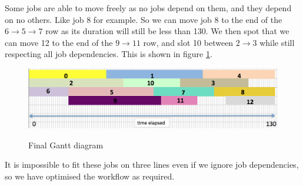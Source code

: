 \documentclass[paper=a4, fontsize=12pt]{scrartcl} %
\numberwithin{equation}{section}       %
\numberwithin{figure}{section}         %
\numberwithin{table}{section}          %
\begin{document}
Some jobs are able to move freely as no jobs depend on them, and they depend on no others. Like job 8 for example. So we can move job 8 to the end of the $6 \to 5 \to 7$ row as its duration will still be less than 130. We then spot that we can move 12 to the end of the $9 \to 11$ row, and slot 10 between $2 \to 3$ while still respecting all job dependencies. This is shown in figure \ref{fourth}.

\begin{figure}[h]
\caption{Final Gantt diagram}
\centering
\includegraphics[scale=0.6]{final}\label{fourth}
\end{figure}

It is impossible to fit these jobs on three lines even if we ignore job dependencies, so we have optimised the workflow as required.
\end{document}
